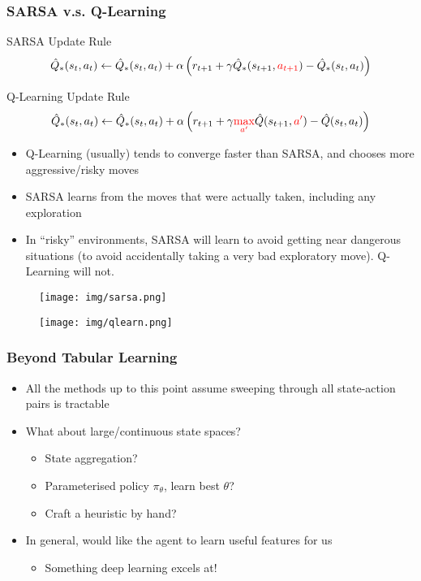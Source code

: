 \documentclass[10pt,a4paper, handout]{beamer}
\newcommand{\red}[1]{\textcolor{red}{#1}}
\begin{document}
\begin{frame}
	\frametitle{SARSA v.s. Q-Learning}
	\begin{block}{SARSA Update Rule}
		$$
		\hat{Q}_*(s_t, a_t) \leftarrow  \hat{Q}_*(s_t, a_t) + \alpha 
		\left( r_{t+1} + \gamma \hat{Q}_*(s_{t+1}, \red{a_{t+1}}) - \hat{Q}_*(s_t, a_t) \right) 
		$$
	\end{block}
\begin{block}{Q-Learning Update Rule}
	$$
	\hat{Q}_*(s_t, a_t)  \leftarrow \hat{Q}_*(s_t,a_t)
	+ \alpha \left( 
	r_{t+1} + \gamma \red{\max_{a'}} \hat{Q}(s_{t+1}, \red{a'}) - \hat{Q}(s_t, a_t)
	\right)
	$$
\end{block}
\begin{itemize}
	\item Q-Learning (usually) tends to converge faster than SARSA, and chooses more
	aggressive/risky moves 
	\item SARSA learns from the moves that were actually
	taken, including any exploration
	\item In ``risky'' environments, SARSA will learn to avoid getting near dangerous situations
	(to avoid accidentally taking a very bad exploratory move). Q-Learning will not.
\end{itemize}
\end{frame}


\begin{frame}
	
	\begin{figure}
		\centering
		\texttt{[image: img/sarsa.png]}
	\end{figure}
	\vspace{-0.45cm}
	\begin{figure}
		\centering
		\texttt{[image: img/qlearn.png]}
	\end{figure}
\end{frame}


\begin{frame}
	\frametitle{Beyond Tabular Learning}
	
\begin{itemize}
	\item All the methods up to this point assume sweeping through 
	all state-action pairs is tractable
	\pause
	\item What about large/continuous state spaces?
	\pause
	\begin{itemize}
		\item State aggregation?
		\pause
		\item Parameterised policy $\pi_\theta$, learn best $\theta$?
		\pause
		\item Craft a heuristic by hand?
	\end{itemize}
\pause
	\item In general, would like the agent to learn useful features for us
	\pause
	\begin{itemize}
		\item Something deep learning excels at!
	\end{itemize}
\end{itemize}
\end{frame}
\end{document}
